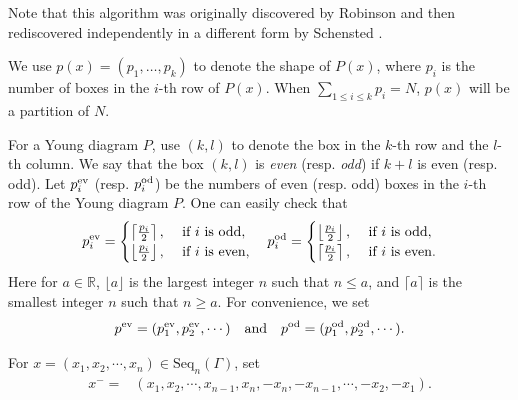 \documentclass[reqno,12pt]{amsart}
\numberwithin{equation}{section}
\theoremstyle{plain}
\theoremstyle{definition}
\renewcommand{\leq}{\leqslant}
\renewcommand{\geq}{\geqslant}
\begin{document}
Note that this  algorithm  was  originally
discovered by Robinson
 \cite{Rob38} and then rediscovered independently in a different form by Schensted \cite{Sc61}. 
 
We use $p(x)=(p_1,\dots, p_k)$ to denote the shape of $P(x)$, where $p_i$ is the number of boxes in the $i$-th row of  $P(x)$.
When $\sum\limits_{1\leq i\leq k} p_i=N$, $p(x)$ will be a partition of $N$.











	For a Young diagram $P$, use $ (k,l) $ to denote the box in the $ k $-th row and the $ l $-th column.
	We say that the box $ (k,l) $ is \textit{even} (resp. \textit{odd}) if $ k+l $ is even (resp. odd). Let $ p_i ^{\rm ev}$ (resp. $ p_i^{\rm od} $) be the numbers of even (resp. odd) boxes in the $ i $-th row of the Young diagram $ P $.
	One can easily check that
	\begin{equation}\label{eq:ev-od}
	p_i^{\rm ev}=\begin{cases}
	\left\lceil \frac{p_i}{2} \right\rceil,&\text{ if } i \text{ is odd},\\
	\left\lfloor \frac{p_i}{2} \right\rfloor,&\text{ if } i \text{ is even},
	\end{cases}
	\quad p_i^{\rm od}=\begin{cases}
	\left\lfloor \frac{p_i}{2} \right\rfloor,&\text{ if } i \text{ is odd},\\
	\left\lceil \frac{p_i}{2} \right\rceil,&\text{ if } i \text{ is even}.
	\end{cases}
	\end{equation}
	Here for $ a\in \mathbb{R} $, $ \lfloor a \rfloor $ is the largest integer $ n $ such that $ n\leq a $, and $ \lceil a \rceil$ is the smallest integer $n$ such that $ n\geq a $. For convenience, we set
	\begin{equation*}
	p^{\rm ev}=(p_1^{\rm ev},p_2^{\rm ev},\cdots)\quad\mbox{and}\quad p^{\rm od}=(p_1^{\rm od},p_2^{\rm od},\cdots).
	\end{equation*}
	
	For $ x=(x_1,x_2,\cdots,x_n)\in \mathrm{Seq}_n (\Gamma) $, set
	\begin{equation*}
	\begin{aligned}
	{x}^-=&(x_1,x_2,\cdots,x_{n-1}, x_n,-x_n,-x_{n-1},\cdots,-x_2,-x_1).
	\end{aligned}
	\end{equation*}
	
\end{document}
